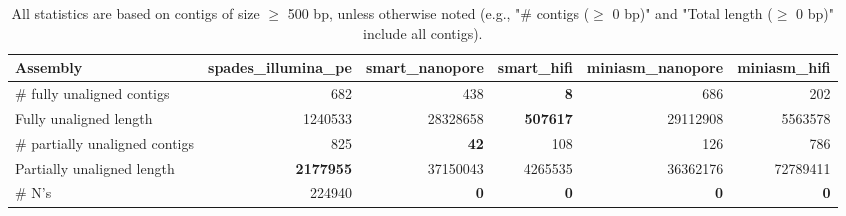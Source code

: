 \documentclass[12pt,a4paper]{article}
\begin{document}
\begin{table}[ht]
\begin{center}
\caption{All statistics are based on contigs of size $\geq$ 500 bp, unless otherwise noted (e.g., "\# contigs ($\geq$ 0 bp)" and "Total length ($\geq$ 0 bp)" include all contigs).}
\begin{tabular}{|l*{5}{|r}|}
\hline
Assembly & spades\_illumina\_pe & smart\_nanopore & smart\_hifi & miniasm\_nanopore & miniasm\_hifi \\ \hline
\# fully unaligned contigs & 682 & 438 & {\bf 8} & 686 & 202 \\ \hline
Fully unaligned length & 1240533 & 28328658 & {\bf 507617} & 29112908 & 5563578 \\ \hline
\# partially unaligned contigs & 825 & {\bf 42} & 108 & 126 & 786 \\ \hline
Partially unaligned length & {\bf 2177955} & 37150043 & 4265535 & 36362176 & 72789411 \\ \hline
\# N's & 224940 & {\bf 0} & {\bf 0} & {\bf 0} & {\bf 0} \\ \hline
\end{tabular}
\end{center}
\end{table}
\end{document}
